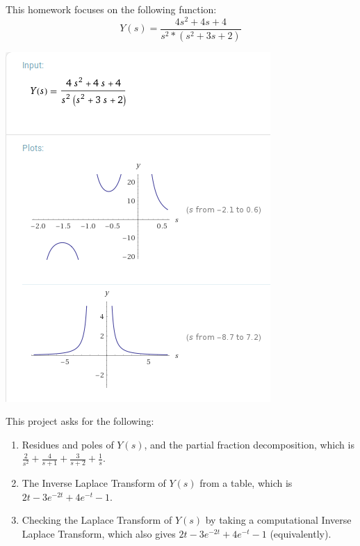 
This homework focuses on the following function: 
$$ Y(s) = \frac{4s^2 + 4s + 4}{s^2 * (s^2 + 3s + 2)} $$

\includegraphics[scale=0.7]{1.png}

\solution

This project asks for the following:
\begin{enumerate}
    \item Residues and poles of $Y(s)$, and the partial fraction decomposition, which is $\frac{2}{s^2} + \frac{4}{s + 1} + \frac{3}{s + 2} + \frac{1}{s}$.
    \item The Inverse Laplace Transform of $Y(s)$ from a table, which is $2t - 3e^{-2t} + 4e^{-t} - 1$.
    \item Checking the Laplace Transform of $Y(s)$ by taking a computational Inverse Laplace Transform, which also gives $2t - 3e^{-2t} + 4e^{-t} - 1$ (equivalently).
\end{enumerate}
